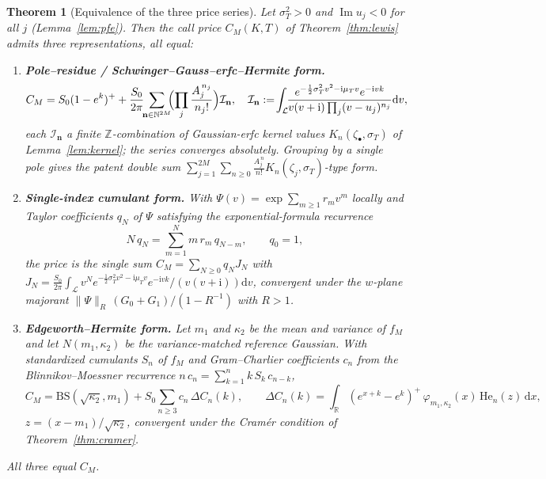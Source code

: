 \documentclass[11pt]{article}
\DeclareMathOperator{\Imag}{Im}
\newcommand{\R}{\mathbb{R}}
\newcommand{\N}{\mathbb{N}}
\newcommand{\Z}{\mathbb{Z}}
\newcommand{\Ii}{\mathrm{i}}
\newcommand{\dd}{\mathrm{d}}
\newcommand{\Herm}{\mathrm{He}}
\theoremstyle{plain}
\newtheorem{theorem}{Theorem}[section]
\theoremstyle{definition}
\theoremstyle{remark}
\begin{document}
\begin{theorem}[Equivalence of the three price series]\label{thm:equivalence}
Let $\sigma_T^2>0$ and $\Imag u_j<0$ for all $j$ (Lemma~\ref{lem:pfe}). Then the
call price $C_M(K,T)$ of Theorem~\ref{thm:lewis} admits three representations, all
equal:
\begin{enumerate}[label=\textup{(F\arabic*)},leftmargin=2.6em]
\item \textbf{Pole--residue / Schwinger--Gauss--erfc--Hermite form.}
\begin{equation}\label{eq:form1}
   C_M=S_0(1-e^{k})^{+}
   +\frac{S_0}{2\pi}\!\!\sum_{\mathbf n\in\N^{2M}}\!\!
     \Bigl(\prod_{j}\frac{A_j^{\,n_j}}{n_j!}\Bigr)
     \mathcal I_{\mathbf n},\quad
   \mathcal I_{\mathbf n}:=\!\int_{\mathcal L}\!\!
     \frac{e^{-\frac12\sigma_T^2v^2-\Ii\mu_Tv}e^{-\Ii vk}}
          {v(v+\Ii)\prod_j(v-u_j)^{n_j}}\dd v,
\end{equation}
each $\mathcal I_{\mathbf n}$ a finite $\Z$-combination of Gaussian-erfc kernel
values $K_n(\zeta_\bullet,\sigma_T)$ of Lemma~\ref{lem:kernel}; the series
converges absolutely. Grouping by a single pole gives the patent double sum
$\sum_{j=1}^{2M}\sum_{n\ge0}\frac{A_j^{\,n}}{n!}K_n(\zeta_j,\sigma_T)$-type form.
\item \textbf{Single-index cumulant form.} With $\Psi(v)=\exp\sum_{m\ge1}r_mv^m$
locally and Taylor coefficients $q_N$ of $\Psi$ satisfying the exponential-formula
recurrence
\begin{equation}\label{eq:qrec}
   N\,q_N=\sum_{m=1}^{N} m\,r_m\,q_{N-m},\qquad q_0=1,
\end{equation}
the price is the single sum $C_M=\sum_{N\ge0}q_N J_N$ with
$J_N=\frac{S_0}{2\pi}\int_{\mathcal L}v^{N}e^{-\frac12\sigma_T^2v^2-\Ii\mu_Tv}
e^{-\Ii vk}/(v(v+\Ii))\dd v$, convergent under the $w$-plane majorant
$\|\Psi\|_R\,(G_0+G_1)/(1-R^{-1})$ with $R>1$.
\item \textbf{Edgeworth--Hermite form.} Let $m_1$ and $\kappa_2$ be the mean and
variance of $f_M$ and let $N(m_1,\kappa_2)$ be the variance-matched reference
Gaussian. With standardized cumulants $S_n$ of $f_M$ and Gram--Charlier
coefficients $c_n$ from the Blinnikov--Moessner recurrence
$n\,c_n=\sum_{k=1}^{n}k\,S_k\,c_{n-k}$,
\begin{equation}\label{eq:form3}
   C_M=\mathrm{BS}(\sqrt{\kappa_2},m_1)
      +S_0\sum_{n\ge3}c_n\,\Delta C_n(k),\qquad
   \Delta C_n(k)=\int_\R (e^{x+k}-e^k)^+\,\varphi_{m_1,\kappa_2}(x)\,\Herm_n(z)\,\dd x,
\end{equation}
$z=(x-m_1)/\sqrt{\kappa_2}$, convergent under the Cramér condition of
Theorem~\ref{thm:cramer}.
\end{enumerate}
All three equal $C_M$.
\end{theorem}
\end{document}
